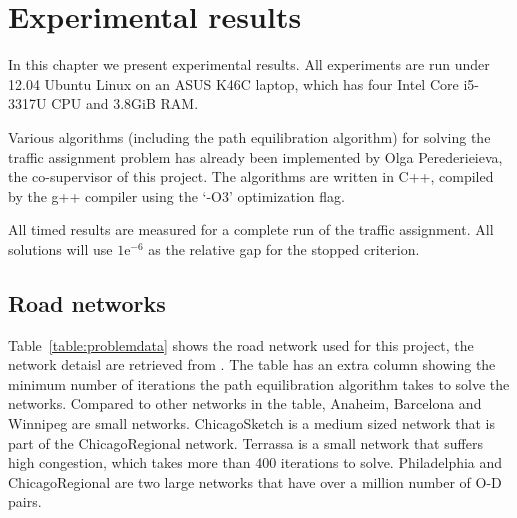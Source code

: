 \chapter{Experimental results}\label{chap:results}

In this chapter we present experimental results.
All experiments are run under 12.04 Ubuntu Linux on an ASUS K46C laptop,
which has four Intel Core i5-3317U CPU and 3.8GiB RAM.

Various algorithms (including the path equilibration algorithm) for solving
the traffic assignment problem has already been implemented by Olga Perederieieva, the co-supervisor of this project.
The algorithms are written in C++, compiled by the g++ compiler using the `-O3' optimization flag.

All timed results are measured for a complete run of the traffic assignment.
All solutions will use $1\text{e}^{-6}$ as the relative gap for the stopped criterion.

\section{Road networks}

Table~\ref{table:problemdata} shows the road network used for this project, the network detaisl are retrieved from \citet{ProblemData}.
The table has an extra column showing the minimum number of iterations the path equilibration algorithm takes to solve the networks.
Compared to other networks in the table,
Anaheim, Barcelona and Winnipeg are small networks.
ChicagoSketch is a medium sized network that is part of the ChicagoRegional network.
Terrassa is a small network that suffers high congestion, which takes more than 400 iterations to solve.
Philadelphia and ChicagoRegional are two large networks that have over a million number of O-D pairs.

